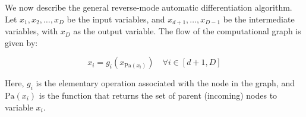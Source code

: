 We now describe the general reverse-mode automatic differentiation algorithm. Let \( x_1, x_2, \dots, x_D \) be the input variables, and \( x_{d+1}, \dots, x_{D-1} \) be the intermediate variables, with \( x_D \) as the output variable. The flow of the computational graph is given by: 

\begin{equation}
    x_i = g_i(x_{\text{Pa}(x_i)})
    \quad \forall i \in [d+1, D]
\end{equation}

Here, \( g_i \) is the elementary operation associated with the node in the graph, and \( \text{Pa}(x_i) \) is the function that returns the set of parent (incoming) nodes to variable \( x_i \).


